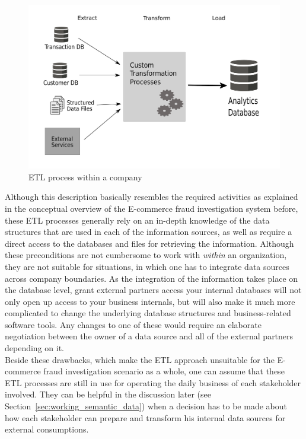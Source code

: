 \begin{figure}[H]
  \centering
  \includegraphics[width=0.9\columnwidth]{images/etl_process.pdf}
  \caption[ETL process within a company]{\gls{ETL} process within a company \citep[pg. 165]{wood2014linked}}
\label{fig:images_etl_process}
\end{figure}

Although this description basically resembles the required activities as explained in the conceptual overview of the \gls{E-commerce} fraud investigation system before, these \gls{ETL} processes generally rely on an in-depth knowledge of the data structures that are used in each of the information sources, as well as require a direct access to the databases and files for retrieving the information. Although these preconditions are not cumbersome to work with \emph{within} an organization, they are not suitable for situations, in which one has to integrate data sources across company boundaries. As the integration of the information takes place on the database level, grant external partners access your internal databases will not only open up access to your business internals, but will also make it much more complicated to change the underlying database structures and business-related software tools. Any changes to one of these would require an elaborate negotiation between the owner of a data source and all of the external partners depending on it. \\

Beside these drawbacks, which make the \gls{ETL} approach unsuitable for the \gls{E-commerce} fraud investigation scenario as a whole, one can assume that these \gls{ETL} processes are still in use for operating the daily business of each stakeholder involved. They can be helpful in the discussion later (see Section~\ref{sec:working_semantic_data}) when a decision has to be made about how each stakeholder can prepare and transform his internal data sources for external consumptions.

